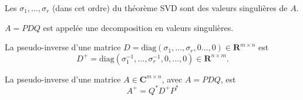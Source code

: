 \begin{definition}
Les $\sigma_{1},\dots,\sigma _{r}$ (dans cet ordre) du théorème SVD sont des valeurs singulières de $A$.
\end{definition}
\begin{definition}
$A=PDQ$ est appelée une decomposition en valeurs singulières.
\end{definition}
\begin{definition}
La pseudo-inverse d'une matrice $D=\mathrm{diag}(\sigma_{1},\dots,\sigma _{r},0\dots,0)\in \mathbf{R}^{m\times n}$ est 
$$
D^{+}=\mathrm{diag}(\sigma _{1}^{-1},\dots,\sigma _{r}^{-1},0,\dots,0)\in \mathbf{R}^{n\times m}.
$$

La pseudo-inverse d'une matrice $A\in \mathbf{C}^{m\times n}$, avec $A=PDQ$, est 
$$
A^{+}=Q^{*}D^{+}P^{*}
$$
\end{definition}
